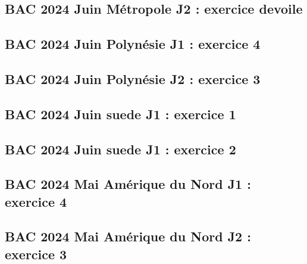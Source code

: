 \documentclass[lang=fr,edition=teacher,layout=sheet]{mxbook}
\begin{document}
\begingroup\endgroup
\par\bigskip
{}\subsection*{BAC 2024 Juin Métropole J2 : exercice devoile}
\begingroup\endgroup
\par\bigskip
{}\subsection*{BAC 2024 Juin Polynésie J1 : exercice 4}
\begingroup\endgroup
\par\bigskip
{}\subsection*{BAC 2024 Juin Polynésie J2 : exercice 3}
\begingroup\endgroup
\par\bigskip
{}\subsection*{BAC 2024 Juin suede J1 : exercice 1}
\begingroup\endgroup
\par\bigskip
{}\subsection*{BAC 2024 Juin suede J1 : exercice 2}
\begingroup\endgroup
\par\bigskip
{}\subsection*{BAC 2024 Mai Amérique du Nord J1 : exercice 4}
\begingroup\endgroup
\par\bigskip
{}\subsection*{BAC 2024 Mai Amérique du Nord J2 : exercice 3}
\end{document}
